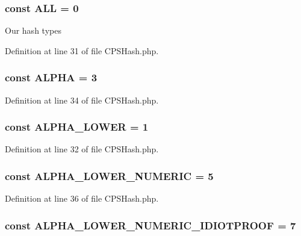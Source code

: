 \hypertarget{classCPSHash_ab56e734000051e5c12c8c5cf6d8d160d}{
\subsubsection[{ALL}]{\setlength{\rightskip}{0pt plus 5cm}const {\bf ALL} = 0}}
\label{classCPSHash_ab56e734000051e5c12c8c5cf6d8d160d}
Our hash types 

Definition at line 31 of file CPSHash.php.

\hypertarget{classCPSHash_a6bb7987358cd3de8e7c775094597e631}{
\subsubsection[{ALPHA}]{\setlength{\rightskip}{0pt plus 5cm}const {\bf ALPHA} = 3}}
\label{classCPSHash_a6bb7987358cd3de8e7c775094597e631}


Definition at line 34 of file CPSHash.php.

\hypertarget{classCPSHash_a33fc57236d932860ab0ad8e8268e0c99}{
\subsubsection[{ALPHA\_\-LOWER}]{\setlength{\rightskip}{0pt plus 5cm}const {\bf ALPHA\_\-LOWER} = 1}}
\label{classCPSHash_a33fc57236d932860ab0ad8e8268e0c99}


Definition at line 32 of file CPSHash.php.

\hypertarget{classCPSHash_a371814049e51cde466af6295bdfed4e3}{
\subsubsection[{ALPHA\_\-LOWER\_\-NUMERIC}]{\setlength{\rightskip}{0pt plus 5cm}const {\bf ALPHA\_\-LOWER\_\-NUMERIC} = 5}}
\label{classCPSHash_a371814049e51cde466af6295bdfed4e3}


Definition at line 36 of file CPSHash.php.

\hypertarget{classCPSHash_aa15c0932a4cd96ab710478faace6ccb9}{
\subsubsection[{ALPHA\_\-LOWER\_\-NUMERIC\_\-IDIOTPROOF}]{\setlength{\rightskip}{0pt plus 5cm}const {\bf ALPHA\_\-LOWER\_\-NUMERIC\_\-IDIOTPROOF} = 7}}
\label{classCPSHash_aa15c0932a4cd96ab710478faace6ccb9}


